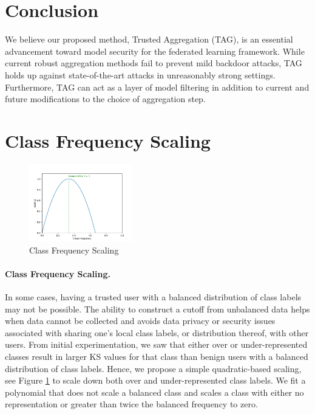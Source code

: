 \documentclass{article} %
\begin{document}
% 
\section{Conclusion}

We believe our proposed method, Trusted Aggregation (TAG), is an essential advancement toward model security for the federated learning framework. While current robust aggregation methods fail to prevent mild backdoor attacks, TAG holds up against state-of-the-art attacks in unreasonably strong settings. Furthermore, TAG can act as a layer of model filtering in addition to current and future modifications to the choice of aggregation step.

\newpage
{  \small 


}


%
\pagebreak
\appendix

%
\section{Class Frequency Scaling}

\begin{figure}
    \centering
    \includegraphics[width=0.4\textwidth]{make_article/make_visuals/visuals/scaling.png}
    \caption{Class Frequency Scaling}
    \label{fig:scaling}
\end{figure}

\paragraph{Class Frequency Scaling.} In some cases, having a trusted user with a balanced distribution of class labels may not be possible. The ability to construct a cutoff from unbalanced data helps when data cannot be collected and avoids data privacy or security issues associated with sharing one's local class labels, or distribution thereof, with other users. From initial experimentation, we saw that either over or under-represented classes result in larger KS values for that class than benign users with a balanced distribution of class labels. Hence, we propose a simple quadratic-based scaling, see Figure \ref{fig:scaling} to scale down both over and under-represented class labels. We fit a polynomial that does not scale a balanced class and scales a class with either no representation or greater than twice the balanced frequency to zero.
\end{document}
